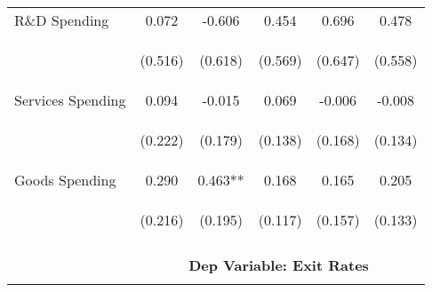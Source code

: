 \begin{tabular}{lccccc}
    R\&D Spending & 0.072 & -0.606 & 0.454 & 0.696 & 0.478 \\
    & \begin{footnotesize}(0.516)\end{footnotesize} & \begin{footnotesize}(0.618)\end{footnotesize} & \begin{footnotesize}(0.569)\end{footnotesize} & \begin{footnotesize}(0.647)\end{footnotesize} & \begin{footnotesize}(0.558)\end{footnotesize} \\
    Services Spending & 0.094 & -0.015 & 0.069 & -0.006 & -0.008 \\
    & \begin{footnotesize}(0.222)\end{footnotesize} & \begin{footnotesize}(0.179)\end{footnotesize} & \begin{footnotesize}(0.138)\end{footnotesize} & \begin{footnotesize}(0.168)\end{footnotesize} & \begin{footnotesize}(0.134)\end{footnotesize} \\
    Goods Spending & 0.290 & 0.463** & 0.168 & 0.165 & 0.205 \\
    & \begin{footnotesize}(0.216)\end{footnotesize} & \begin{footnotesize}(0.195)\end{footnotesize} & \begin{footnotesize}(0.117)\end{footnotesize} & \begin{footnotesize}(0.157)\end{footnotesize} & \begin{footnotesize}(0.133)\end{footnotesize} \\
    
    \cmidrule{2-6}
    \vspace{-1.5pt} & \vspace{-1.5pt} & \vspace{-1.5pt} & \vspace{-1.5pt} & \vspace{-1.5pt} \\
    & \multicolumn{5}{c}{\textbf{Dep Variable: Exit Rates}} \\ 
    \vspace{-1.5pt} & \vspace{-1.5pt} & \vspace{-1.5pt} & \vspace{-1.5pt} & \vspace{-1.5pt} \\
    \cmidrule{2-6}
    

\end{tabular}
